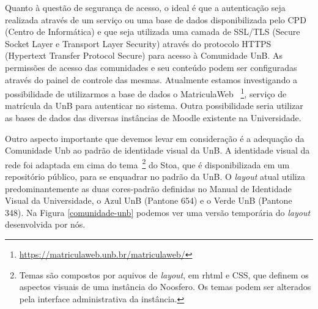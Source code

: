 Quanto à questão de segurança de acesso, o ideal é que a autenticação seja
realizada através de um serviço ou uma base de dados disponibilizada pelo CPD
(Centro de Informática) e que seja utilizada uma camada de SSL/TLS (Secure Socket
Layer e Transport Layer Security) através do protocolo HTTPS (Hypertext Transfer
Protocol Secure) para acesso à Comunidade UnB. As permissões de acesso das
comunidades e seu conteúdo podem ser configuradas através do painel de controle
das mesmas. Atualmente estamos investigando a possibilidade de utilizarmos a
base de dados o MatriculaWeb
~\footnote{\url{https://matriculaweb.unb.br/matriculaweb/}}, serviço de matrícula
da UnB para autenticar no sistema. Outra possibilidade seria utilizar as bases
de dados das diversas instâncias de Moodle existente na Universidade.

Outro aspecto importante que devemos levar em consideração é a adequação da
Comunidade Unb ao padrão de identidade visual da UnB.
A identidade visual da rede foi adaptada em cima do tema~\footnote{Temas são
compostos por aquivos de \textit{layout}, em rhtml e CSS, que definem os aspectos
visuais de uma instância do Noosfero. Os temas podem ser alterados pela interface
administrativa da instância.} do Stoa, que é disponibilizada em um repositório
público, para se enquadrar no padrão da UnB.
%
O \textit{layout} atual utiliza predominantemente as duas cores-padrão definidas
no Manual de Identidade Visual da Universidade\cite{visualUnB}, o Azul UnB
(Pantone 654) e o Verde UnB (Pantone 348). Na Figura \ref{comunidade-unb}
podemos ver uma versão temporária do \textit{layout} desenvolvida por nós.



